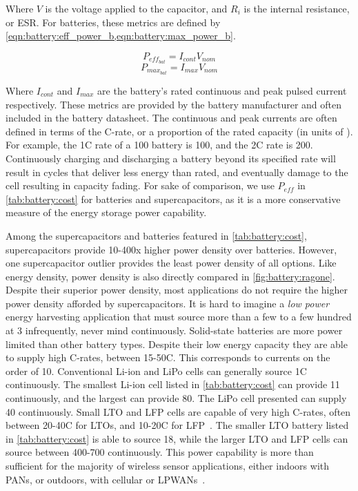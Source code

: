\noindent Where $V$ is the voltage applied to the capacitor, and $R_i$ is the internal resistance, or ESR. For batteries, these metrics are defined by \cref{eqn:battery:eff_power_b,eqn:battery:max_power_b}. 

\begin{equation}\label{eqn:battery:eff_power_b}
P_{eff_{bat}} = I_{cont} V_{nom}
\end{equation}
\begin{equation}\label{eqn:battery:max_power_b}
P_{max_{bat}} = I_{max} V_{nom}
\end{equation}

\noindent Where $I_{cont}$ and $I_{max}$ are the battery's rated continuous and peak pulsed current respectively. These metrics are provided by the battery manufacturer and often included in the battery datasheet. The continuous and peak currents are often defined in terms of the C-rate, or a proportion of the rated capacity (in units of \ssi{\Ah}). For example, the 1C rate of a 100\ssi{\milli\Ah} battery is 100\ssi{\milli\ampere}, and the 2C rate is 200\ssi{\milli\ampere}. 
Continuously charging and discharging a battery beyond its specified rate will result in cycles that deliver less energy than rated, and eventually damage to the cell resulting in capacity fading. 
For sake of comparison, we use $P_{eff}$ in \cref{tab:battery:cost} for batteries and supercapacitors, as it is a more conservative measure of the energy storage power capability. 

Among the supercapacitors and batteries featured in \cref{tab:battery:cost}, supercapacitors provide 10-400x higher power density over batteries. 
However, one supercapacitor outlier provides the least power density of all options. Like energy density, power density is also directly compared in \cref{fig:battery:ragone}.
Despite their superior power density, most applications do not require the higher power density afforded by supercapacitors. 
It is hard to imagine a \textit{low power} energy harvesting application that must source more than a few to a few hundred \ssi{\milli\ampere} at 3\ssi{\volt} infrequently, never mind continuously. 
Solid-state batteries are more power limited than other battery types. Despite their low energy capacity they are able to supply high C-rates, between 15-50C. This corresponds to currents on the order of 10\ssi{\milli\ampere}.
Conventional Li-ion and LiPo cells can generally source 1C continuously. The smallest Li-ion cell listed in \cref{tab:battery:cost} can provide 11\ssi{\milli\ampere} continuously, and the largest can provide 80\ssi{\milli\ampere}. The LiPo cell presented can supply 40\ssi{\milli\ampere} continuously. 
Small LTO and LFP cells are capable of very high C-rates, often between 20-40C for LTOs, and 10-20C for LFP~\cite{lifepo4Datasheet,LTODatasheet,LTODatasheet2}.
The smaller LTO battery listed in \cref{tab:battery:cost} is able to source 18\ssi{\milli\ampere}, while the larger LTO and LFP cells can source between 400-700\ssi{\milli\ampere} continuously. 
This power capability is more than sufficient for the majority of wireless sensor applications, either indoors with PANs, or outdoors, with cellular or LPWANs~\cite{nrf52840,ghena2019challenge}.

